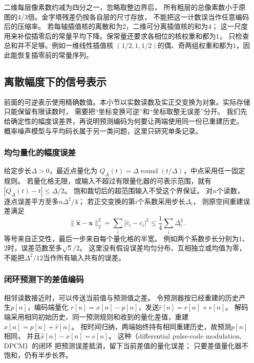 二维每层像素数约减为四分之一，忽略取整边界后，
所有粗层的总像素数小于原图的$4/3$倍。金字塔残差仍按各自层的尺寸存放，
不能把这一计数误当作任意编码后的压缩率。
若每轴插值核的离散和为$2$，二维可分离插值核的和为$4$；
这一尺度用来补偿插零后的常量平均下降。保常量还要求各相位的核权重和都为$1$，
只检查总和并不足够。例如一维线性插值核
$(1/2,1,1/2)$的偶、奇两组权重和都为$1$，因此能恢复插零前的常量序列。

\subsection{离散幅度下的信号表示}
\label{sec:signal-quantized-representation}

前面的可逆表示使用精确数值。本小节以实数读数及实正交变换为对象。实际存储只能保留有限读数时，
需要把“坐标变换可逆”和“坐标取整无误差”分开。
我们先给确定性的幅度误差界，再说明预测编码为何要让两端使用同一份已重建历史。
概率噪声模型与平均码长属于另一类问题，这里只研究单条记录。

\subsubsection{均匀量化的幅度误差}
给定步长$\Delta>0$，最近点量化为
$Q_\Delta(t)=\Delta\operatorname{round}(t/\Delta)$，中点采用任一固定规则。
若量化格无限，或输入不超过有限量化器的可表示范围，就有
$|Q_\Delta(t)-t|\leq\Delta/2$。
饱和裁切后的超范围输入不受这个界保证。
对$n$个读数，逐点误差平方至多$n\Delta^2/4$；
若正交变换的第$i$个系数采用步长$\Delta_i$，
则原空间重建误差满足
\begin{equation}
 \|\widehat{\bm x}-\bm x\|_2^2
 =\sum_i|\widehat c_i-c_i|^2
 \leq\frac14\sum_i\Delta_i^2 .
 \label{eq:signal-quantization-bound}
\end{equation}
等号来自正交性，最后一步来自每个量化格的半宽。
例如两个系数步长分别为$1$、$2$时，误差范数至多$\sqrt5/2$。
这里没有假设误差均匀分布、互相独立或均值为零，
不能把$\Delta^2/12$当作所有输入共有的误差。

\subsubsection{闭环预测下的差值编码}
相邻读数接近时，可以传送当前值与预测值之差。
令预测器按已经重建的历史产生$p[n]$，编码端量化
$r[n]=x[n]-p[n]$，发送$\widehat r[n]=r[n]+e[n]$。
解码端采用相同初始历史、同一预测规则和收到的量化差值，重建
$\widehat x[n]=p[n]+\widehat r[n]$。
按时间归纳，两端始终持有相同重建历史，故预测$p[n]$相同，
并且$\widehat x[n]-x[n]=e[n]$。
这种（differential pulse-code modulation, DPCM）的闭环
把预测误差抵消，留下当前差值的量化误差；
只要差值量化器不饱和，仍有半步长界。

